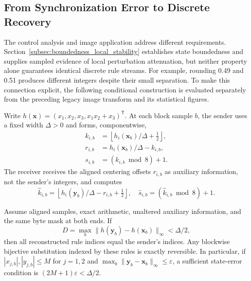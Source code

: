 \FloatBarrier
\subsection{From Synchronization Error to Discrete Recovery}
\label{subsec:sync_application_bridge}

The control analysis and image application address different requirements. Section~\ref{subsec:boundedness_local_stability} establishes state boundedness and supplies sampled evidence of local perturbation attenuation, but neither property alone guarantees identical discrete rule streams. For example, rounding 0.49 and 0.51 produces different integers despite their small separation. To make this connection explicit, the following conditional construction is evaluated separately from the preceding legacy image transform and its statistical figures.

Write $h(\mathbf{x})=(x_1,x_2,x_3,x_1x_2+x_3)^{\mathsf T}$. At each block sample $b$, the sender uses a fixed width $\Delta>0$ and forms, componentwise,
\begin{equation}
\begin{aligned}
 k_{i,b}&=\left\lfloor h_i(\mathbf{x}_b)/\Delta+\tfrac12\right\rfloor,\\
 r_{i,b}&=h_i(\mathbf{x}_b)/\Delta-k_{i,b},\\
 s_{i,b}&=(k_{i,b}\bmod8)+1.
\end{aligned}
\label{eq:bridge_sender}
\end{equation}
The receiver receives the aligned centering offsets $r_{i,b}$ as auxiliary information, not the sender's integers, and computes
\begin{equation}
\widehat k_{i,b}=\left\lfloor h_i(\mathbf{y}_b)/\Delta-r_{i,b}+\tfrac12\right\rfloor,
\quad \widehat s_{i,b}=(\widehat k_{i,b}\bmod8)+1.
\label{eq:bridge_receiver}
\end{equation}

\begin{proposition}
\label{prop:discrete_recovery}
Assume aligned samples, exact arithmetic, unaltered auxiliary information, and the same byte mask at both ends. If
\begin{equation}
 D=\max_b\|h(\mathbf{y}_b)-h(\mathbf{x}_b)\|_\infty<\Delta/2,
\label{eq:bridge_stream_condition}
\end{equation}
then all reconstructed rule indices equal the sender's indices. Any blockwise bijective substitution indexed by these rules is exactly reversible. In particular, if $|x_{j,b}|,|y_{j,b}|\leq M$ for $j=1,2$ and $\max_b\|\mathbf{y}_b-\mathbf{x}_b\|_\infty\leq\varepsilon$, a sufficient state-error condition is $(2M+1)\varepsilon<\Delta/2$.
\end{proposition}

